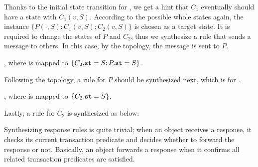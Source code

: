 \documentclass[format=manuscript]{acmart}
\begin{document}
Thanks to the initial state transition for , we get a hint that
$C_1$ eventually should have a state with $C_1(v, S)$. According to the possible
whole states again, the instance $\{ P(\cdot, S); C_1(v, S); C_2(v, S) \}$ is
chosen as a target state. It is required to change the states of $P$ and $C_2$,
thus we synthesize a rule that sends a message to others. In this case, by the
topology, the message is sent to $P$.

\begin{center}
  , where
   is mapped to $\{ C_2.\texttt{st} = S; P.\texttt{st} = S \}$.
\end{center}

Following the topology, a rule for $P$ should be synthesized next, which is for
.

\begin{center}
  , where
   is mapped to $\{ C_2.\texttt{st} = S \}$.
\end{center}

Lastly, a rule for $C_2$ is synthesized as below:

\begin{center}
\end{center}

Synthesizing response rules is quite trivial; when an object receives a
response, it checks its current transaction predicate and decides whether to
forward the response or not. Basically, an object forwards a response when it
confirms all related transaction predicates are satisfied.

\begin{center}
\end{center}

\begin{center}
\end{center}
\end{document}
